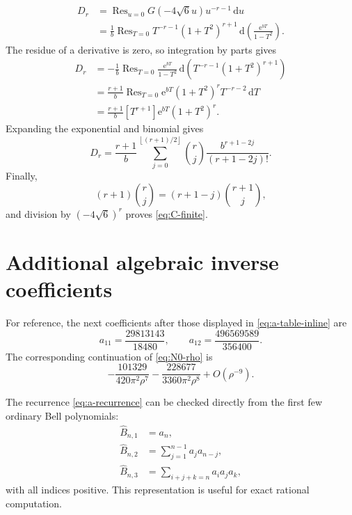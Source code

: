 \documentclass[11pt,a4paper]{article}
\numberwithin{equation}{section}
\theoremstyle{definition}
\theoremstyle{remark}
\DeclareMathOperator{\Res}{Res}
\newcommand{\e}{\mathrm e}
\newcommand{\dd}{\,\mathrm d}
\newcommand{\Bhat}{\widehat{B}}
\newcommand{\floor}[1]{\left\lfloor#1\right\rfloor}
\begin{document}
\begin{align}
 D_r
 &=\Res_{u=0}G(-4\sqrt6u)u^{-r-1}\dd u\nonumber\\
 &=\frac1b\Res_{T=0}
 T^{-r-1}(1+T^2)^{r+1}
 \dd\left(\frac{\e^{bT}}{1-T^2}\right).
 \label{eq:Dr-residue-1}
\end{align}
The residue of a derivative is zero, so integration by parts gives
\begin{align}
 D_r
 &=-\frac1b\Res_{T=0}\frac{\e^{bT}}{1-T^2}
 \dd\left(T^{-r-1}(1+T^2)^{r+1}\right)\nonumber\\
 &=\frac{r+1}{b}\Res_{T=0}
 \e^{bT}(1+T^2)^rT^{-r-2}\dd T\nonumber\\
 &=\frac{r+1}{b}[T^{r+1}]\e^{bT}(1+T^2)^r.
 \label{eq:Dr-residue-2}
\end{align}
Expanding the exponential and binomial gives
\begin{equation}\label{eq:Dr-binomial}
 D_r=\frac{r+1}{b}
 \sum_{j=0}^{\floor{(r+1)/2}}
 \binom rj\frac{b^{r+1-2j}}{(r+1-2j)!}.
\end{equation}
Finally,
\begin{equation}\label{eq:binomial-identity}
 (r+1)\binom rj=(r+1-j)\binom{r+1}{j},
\end{equation}
and division by $(-4\sqrt6)^r$ proves \eqref{eq:C-finite}.

\section{Additional algebraic inverse coefficients}

For reference, the next coefficients after those displayed in
\eqref{eq:a-table-inline} are
\begin{equation}\label{eq:a-more}
 a_{11}=\frac{29813143}{18480},\qquad
 a_{12}=\frac{496569589}{356400}.
\end{equation}
The corresponding continuation of \eqref{eq:N0-rho} is
\begin{equation}\label{eq:N0-more}
 -\frac{101329}{420\pi^2\rho^7}
 -\frac{228677}{3360\pi^2\rho^8}+O(\rho^{-9}).
\end{equation}

The recurrence \eqref{eq:a-recurrence} can be checked directly from the first
few ordinary Bell polynomials:
\begin{align*}
 \Bhat_{n,1}&=a_n,\\
 \Bhat_{n,2}&=\sum_{j=1}^{n-1}a_ja_{n-j},\\
 \Bhat_{n,3}&=\sum_{i+j+k=n}a_ia_ja_k,
\end{align*}
with all indices positive.  This representation is useful for exact rational
computation.
\end{document}
